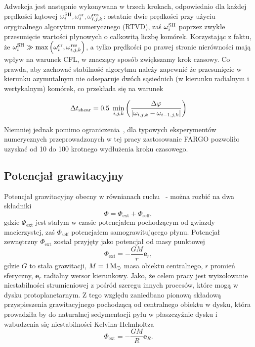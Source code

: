 Adwekcja jest następnie wykonywana w trzech krokach, odpowiednio dla każdej
prędkości kątowej $\omega_i^{\rm SH}, \omega_i^{\rm cr}, \omega_{i,j,k}^{\rm
res}$: ostatnie dwie prędkości przy użyciu oryginalnego algorytmu numerycznego
(RTVD), zaś $\omega_i^{\rm SH}$ poprzez zwykłe przesunięcie wartości płynowych o
całkowitą liczbę komórek. Korzystając z faktu, że $\omega_i^{\rm SH} \gg
\max\left(\omega_i^{\rm cr}, \omega_{i,j,k}^{\rm res}\right)$, a tylko prędkości
po prawej stronie nierówności mają wpływ na warunek CFL, w znaczący sposób
zwiększamy krok czasowy. Co prawda, aby zachować stabilność algorytmu należy
zapewnić że przesunięcie w kierunku azymutalnym nie odseparuje dwóch sąsiednich
(w kierunku radialnym i wertykalnym) komórek, co przekłada się na warunek

\begin{equation}\label{eq:tshear}
   \Delta t_{\rm shear} = 0.5 ~ \min_{i,j,k} \left( \frac{\Delta\varphi}
   {|\omega_{i,j,k} - \omega_{i-1,j,k}|} \right)
\end{equation}

Niemniej jednak pomimo ograniczenia~, dla typowych eksperymentów
numerycznych przeprowadzonych w tej pracy zastosowanie FARGO pozwoliło uzyskać
od 10 do 100 krotnego wydłużenia kroku czasowego.


\subsection{Potencjał grawitacyjny}
Potencjał grawitacyjny obecny w równianach ruchu~ -  można
rozbić na dwa składniki
\begin{equation}
   \Phi = \Phi_{\textrm{ext}} + \Phi_{\textrm{self}},
\end{equation}
gdzie $\Phi_{\textrm{ext}}$ jest stałym w czasie potencjałem pochodzącym od
gwiazdy macierzystej, zaś $\Phi_{\textrm{self}}$ potencjałem samograwitującego
płynu. Potencjał zewnętrzny $\Phi_{\textrm{ext}}$ został przyjęty jako potencjał
od masy punktowej
\begin{equation}
   \Phi_{\textrm{ext}} = -\frac{GM}{r} \mathbf{e}_r,
\end{equation}
gdzie $G$ to stała grawitacji, $M = 1\hbox{$\mathrm{\thinspace M_{\odot}}$}$ masa obiektu centralnego, $r$
promień sferyczny, $\mathbf{e}_r$ radialny wersor kierunkowy.
Jako, że celem pracy jest wyizolowanie niestabilności strumieniowej z pośród
szeregu innych procesów, które mogą w dysku protoplanetarnym. Z tego względu
zaniedbano pionową składową przyspieszenia grawitacyjnego pochodzącą od
centralnego obiektu w dysku, która prowadziła by do naturalnej sedymentacji pyłu
w płaszczyźnie dysku i wzbudzenia się niestabilności
Kelvina-Helmholtza~\cite{JHK06}
\begin{equation}\label{eq:phiext}
   \Phi_{\textrm{ext}} = -\frac{GM}{R} \mathbf{e}_R.
\end{equation}

